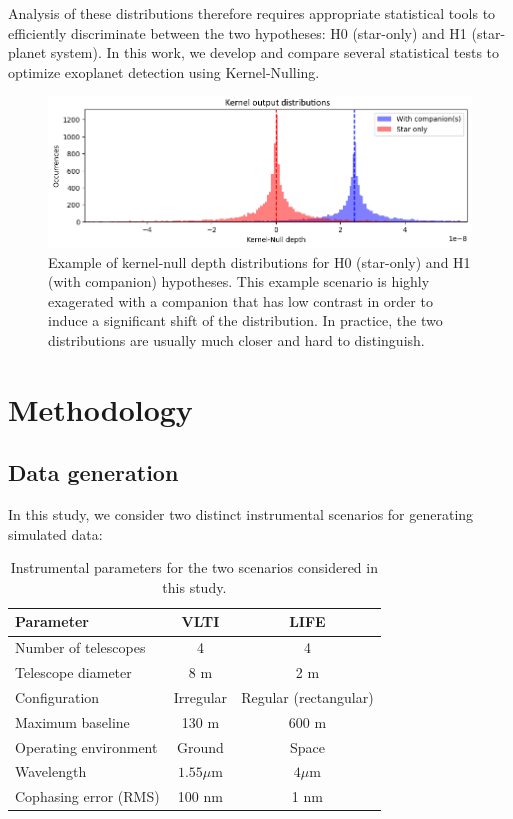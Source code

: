 \documentclass{article}
\begin{document}
Analysis of these distributions therefore requires appropriate statistical tools to efficiently discriminate between the two hypotheses: H0 (star-only) and H1 (star-planet system). In this work, we develop and compare several statistical tests to optimize exoplanet detection using Kernel-Nulling.

\begin{figure}[H]
\centering
\includegraphics[width=\linewidth]{img/output_distribution.png}
\caption{Example of kernel-null depth distributions for H0 (star-only) and H1 (with companion) hypotheses. This example scenario is highly exagerated with a companion that has low contrast in order to induce a significant shift of the distribution. In practice, the two distributions are usually much closer and hard to distinguish.}
\label{fig:distribution}
\end{figure}


\section{Methodology}

\subsection{Data generation}

In this study, we consider two distinct instrumental scenarios for generating simulated data:

\begin{table}[H]
\centering
\begin{tabular}{|l|c|c|}
\hline
\textbf{Parameter} & \textbf{VLTI} & \textbf{LIFE} \\
\hline
Number of telescopes & 4 & 4 \\
Telescope diameter & 8 m & 2 m \\
Configuration & Irregular & Regular (rectangular) \\
Maximum baseline & 130 m & 600 m \\
Operating environment & Ground & Space \\
Wavelength & $1.55\mu$m & $4\mu$m \\
Cophasing error (RMS) & 100 nm & 1 nm \\
\hline
\end{tabular}
\caption{Instrumental parameters for the two scenarios considered in this study.}
\label{tab:scenarios}
\end{table}
\end{document}
